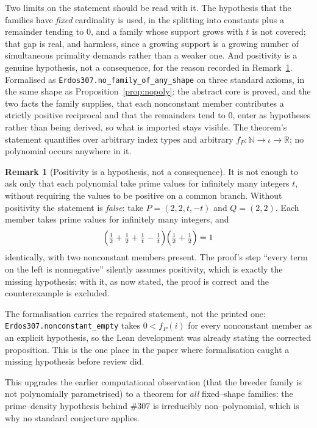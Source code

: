 \documentclass[11pt]{article}
\theoremstyle{definition}
\newtheorem{remark}[theorem]{Remark}
\begin{document}
Two limits on the statement should be read with it. The hypothesis that the families have
\emph{fixed} cardinality is used, in the splitting into constants plus a remainder tending to $0$, and
a family whose support grows with $t$ is not covered; that gap is real, and harmless, since a growing
support is a growing number of simultaneous primality demands rather than a weaker one. And
positivity is a genuine hypothesis, not a consequence, for the reason recorded in
Remark~\ref{rem:nopolyerratum}. Formalised as \texttt{Erdos307.no\_family\_of\_any\_shape} on three
standard axioms, in the same shape as Proposition~\ref{prop:nopoly}: the abstract core is proved, and
the two facts the family supplies, that each nonconstant member contributes a strictly positive
reciprocal and that the remainders tend to $0$, enter as hypotheses rather than being derived, so
what is imported stays visible. The theorem's statement quantifies over arbitrary index types and
arbitrary $f_P:\mathbb{N}\to\iota\to\mathbb{R}$; no polynomial occurs anywhere in it.

\begin{remark}[Positivity is a hypothesis, not a consequence]\label{rem:nopolyerratum}
It is not enough to ask only that each polynomial take prime values for infinitely many integers $t$, without requiring the values to be positive on a common branch. Without positivity the statement is \emph{false}: take $P=(2,2,t,-t)$ and $Q=(2,2)$. Each member takes prime values for infinitely many
integers, and
\[ \Bigl(\tfrac12+\tfrac12+\tfrac1t-\tfrac1t\Bigr)\Bigl(\tfrac12+\tfrac12\Bigr)=1 \]
identically, with two nonconstant members present. The proof's step ``every term on the left is
nonnegative'' silently assumes positivity, which is exactly the missing hypothesis; with it, as now
stated, the proof is correct and the counterexample is excluded.

The formalisation carries the repaired statement, not the printed one:
\texttt{Erdos307.nonconstant\_empty} takes $0<f_P(i)$ for every nonconstant member as an explicit
hypothesis, so the Lean development was already stating the corrected proposition. This is the one
place in the paper where formalisation caught a missing hypothesis before review did.
\end{remark}

\noindent This upgrades the earlier computational observation (that the breeder family is not
polynomially parametrised) to a theorem for \emph{all} fixed--shape families: the prime--density
hypothesis behind \#307 is irreducibly non--polynomial, which is why no standard conjecture applies.
\end{document}
